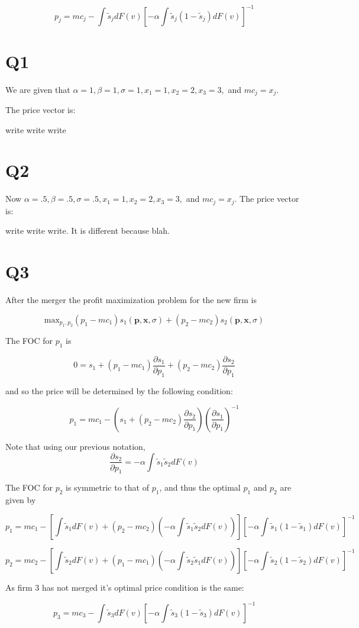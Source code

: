 \documentclass{article}
\newcommand{\1}{\mathbbm{1}}
\begin{document}
$$p_j = mc_j - \int \tilde{s}_j dF(v)[ -\alpha \int \tilde{s}_j(1-\tilde{s}_j)dF(v)]^{-1}$$

\section{Q1}
We are given that $\alpha = 1, \beta = 1, \sigma = 1, x_1 = 1, x_2 = 2, x_3 = 3,$ and $mc_j = x_j$. 

The price vector is: 

\color{red}
write write write
\color{black}

\section{Q2}
Now $\alpha = .5, \beta = .5, \sigma = .5, x_1 = 1, x_2 = 2, x_3 = 3,$ and $mc_j = x_j$. 
The price vector is: 

\color{red}
write write write. It is different because blah.
\color{black}


\section{Q3}
After the merger the profit maximization problem for the new firm is  

$$\text{max}_{p_1, p_2} (p_1 - mc_1)s_1(\bm p, \bm x, \sigma) + (p_2 - mc_2)s_2(\bm p, \bm x, \sigma)$$

The FOC for $p_1$ is 

$$0 = s_1 + (p_1 - mc_1)\frac{\partial s_1}{\partial p_1}   + (p_2 - mc_2)\frac{\partial s_2}{\partial p_1}$$

and so the price will be determined by the following condition:

$$p_1 = mc_1 - (s_1 + (p_2 - mc_2)\frac{\partial s_2}{\partial p_1})(\frac{\partial s_1}{\partial p_1})^{-1}$$

Note that using our previous notation,
$$\frac{\partial s_2}{\partial p_1} = - \alpha \int \tilde{s}_1\tilde{s}_2dF(v)$$

The FOC for $p_2$ is symmetric to that of $p_1$, and thus the optimal $p_1$ and $p_2$ are given by

$$p_1 = mc_1 - [\int \tilde{s}_1 dF(v) + (p_2 - mc_2)(- \alpha \int \tilde{s}_1\tilde{s}_2dF(v))][-\alpha \int \tilde{s}_1(1-\tilde{s}_1)dF(v)]^{-1}$$


$$p_2 = mc_2 - [\int \tilde{s}_2 dF(v) + (p_1 - mc_1)(- \alpha \int \tilde{s}_2\tilde{s}_1dF(v))][-\alpha \int \tilde{s}_2(1-\tilde{s}_2)dF(v)]^{-1}$$

As firm 3 has not merged it's optimal price condition is the same:

$$p_3 = mc_3 - \int \tilde{s}_3 dF(v)[ -\alpha \int \tilde{s}_3(1-\tilde{s}_3)dF(v)]^{-1}$$
\end{document}
